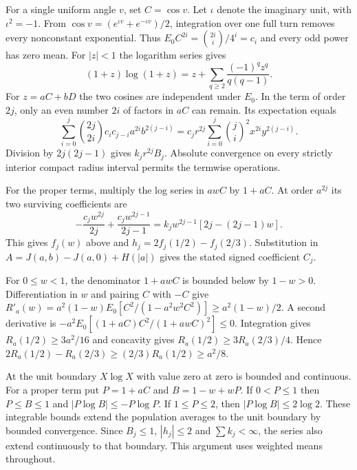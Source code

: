 For a single uniform angle \(v\), set \(C=\cos v\). Let \(\iota\) denote the imaginary unit, with \(\iota^2=-1\). From \(\cos v=(e^{\iota v}+e^{-\iota v})/2\), integration over one full turn removes every nonconstant exponential. Thus \(E_0 C^{2i}=\binom{2i}{i}/4^i=c_i\) and every odd power has zero mean. For \(|z|<1\) the logarithm series gives \[
(1+z)\log(1+z)=z+\sum_{q\ge2}\frac{(-1)^q z^q}{q(q-1)}.
\] For \(z=aC+bD\) the two cosines are independent under \(E_0\). In the term of order \(2j\), only an even number \(2i\) of factors in \(aC\) can remain. Its expectation equals \[
\sum_{i=0}^j \binom{2j}{2i}c_i c_{j-i} a^{2i} b^{2(j-i)}
 =c_j r^{2j}\sum_{i=0}^j \binom ji^2 x^{2i}y^{2(j-i)}.
\] Division by \(2j(2j-1)\) gives \(k_jr^{2j}B_j\). Absolute convergence on every strictly interior compact radius interval permits the termwise operations.

For the proper terms, multiply the log series in \(awC\) by \(1+aC\). At order \(a^{2j}\) its two surviving coefficients are \[
-\frac{c_j w^{2j}}{2j}+\frac{c_j w^{2j-1}}{2j-1}=k_j w^{2j-1}[2j-(2j-1)w].
\] This gives \(f_j(w)\) above and \(h_j=2f_j(1/2)-f_j(2/3)\). Substitution in \(A=J(a,b)-J(a,0)+H(|a|)\) gives the stated signed coefficient \(C_j\).

For \(0\le w<1\), the denominator \(1+awC\) is bounded below by \(1-w>0\). Differentiation in \(w\) and pairing \(C\) with \(-C\) give \(R'_a(w)=a^2(1-w)E_0[C^2/(1-a^2w^2C^2)]\ge a^2(1-w)/2\). A second derivative is \(-a^2 E_0[(1+aC) C^2/(1+awC)^2]\le0\). Integration gives \(R_a(1/2)\ge3a^2/16\) and concavity gives \(R_a(1/2)\ge3R_a(2/3)/4\). Hence \(2R_a(1/2)-R_a(2/3)\ge(2/3)R_a(1/2)\ge a^2/8\).

At the unit boundary \(X\log X\) with value zero at zero is bounded and continuous. For a proper term put \(P=1+aC\) and \(B=1-w+wP\). If \(0<P\le1\) then \(P\le B\le1\) and \(|P\log B|\le-P\log P\). If \(1\le P\le2\), then \(|P\log B|\le2\log2\). These integrable bounds extend the population averages to the unit boundary by bounded convergence. Since \(B_j\le1\), \(|h_j|\le2\) and \(\sum k_j<\infty\), the series also extend continuously to that boundary. This argument uses weighted means throughout.

